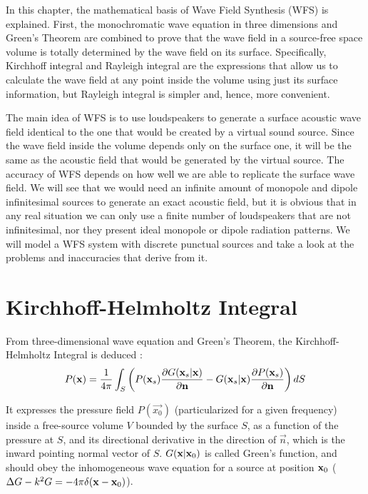 In this chapter, the mathematical basis of Wave Field Synthesis (WFS) is explained. First, the monochromatic wave equation in three dimensions and Green's Theorem are combined to prove that the wave field in a source-free space volume is totally determined by the wave field on its surface. Specifically, Kirchhoff integral and Rayleigh integral are the expressions that allow us to calculate the wave field at any point inside the volume using just its surface information, but Rayleigh integral is simpler and, hence, more convenient. %

The main idea of WFS is to use loudspeakers to generate a surface acoustic wave field identical to the one that would be created by a virtual sound source. Since the wave field inside the volume depends only on the surface one, it will be the same as the acoustic field that would be generated by the virtual source. The accuracy of WFS depends on how well we are able to replicate the surface wave field. We will see that we would need an infinite amount of monopole and dipole infinitesimal sources to generate an exact acoustic field, but it is obvious that in any real situation we can only use a finite number of loudspeakers that are not infinitesimal, nor they present ideal monopole or dipole radiation patterns. We will model a WFS system with discrete punctual sources and take a look at the problems and inaccuracies that derive from it.

\section{Kirchhoff-Helmholtz Integral}
From three-dimensional wave equation and Green's Theorem, the Kirchhoff-Helmholtz Integral is deduced \cite{BerkhoutSeismic} \cite{Verheijen}:
\begin{equation}
P(\PosTheo) = \frac{1}{4\pi} \int_{S} \left(P(\PosTheo[surface])\frac{\partial G(\PosTheo[surface]\vert \PosTheo)}{\partial \mathbf{n}} - G(\PosTheo[surface]\vert \PosTheo) \frac{\partial P(\PosTheo[surface])}{\partial \mathbf{n}} \right) dS
\label{KirchhoffHelmholtz}
\end{equation}

It expresses the pressure field $P(\vec{x_0})$ (particularized for a given frequency) inside a free-source volume $V$ bounded by the surface $S$, as a function of the pressure at $S$, and its directional derivative in the direction of $\vec{n}$, which is the inward pointing normal vector of $S$. $G(\PosTheo \vert \PosTheo_0)$ is called Green's function, and should obey the inhomogeneous wave equation for a source at position $\PosTheo_0$ ($\Delta G - k^2 G = -4\pi\delta(\PosTheo - \PosTheo_0)$).

